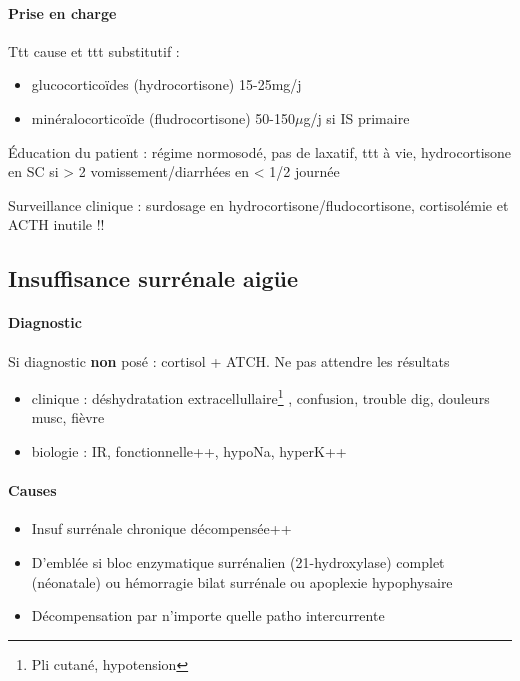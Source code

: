 \documentclass{book}
\begin{document}
\paragraph{Prise en charge}
\label{sec:org7be1bbd}
Ttt cause et ttt substitutif :
\begin{itemize}
\item glucocorticoïdes (hydrocortisone) 15-25mg/j
\item minéralocorticoïde (fludrocortisone) 50-150\(\mu\)g/j si IS primaire
\end{itemize}

Éducation du patient : régime normosodé, pas de laxatif, ttt à vie, hydrocortisone en SC si > 2 vomissement/diarrhées en < 1/2 journée

Surveillance clinique : surdosage en hydrocortisone/fludocortisone, cortisolémie et ACTH inutile !!

\subsection{Insuffisance surrénale aigüe}
\label{sec:org4639dde}

\paragraph{Diagnostic}
\label{sec:org41fded2}
Si diagnostic \textbf{non} posé : cortisol + ATCH. Ne pas attendre les résultats \faBomb
\begin{itemize}
\item clinique : déshydratation extracellullaire\footnote{Pli cutané, hypotension} , confusion, trouble dig, douleurs musc, fièvre
\item biologie : IR, fonctionnelle++, hypoNa, hyperK++
\end{itemize}

\paragraph{Causes}
\label{sec:orgf167543}
\begin{itemize}
\item Insuf surrénale chronique décompensée++
\item D'emblée si bloc enzymatique surrénalien (21-hydroxylase) complet (néonatale)
ou hémorragie bilat surrénale ou apoplexie hypophysaire
\item Décompensation par n'importe quelle patho intercurrente
\end{itemize}
\end{document}
